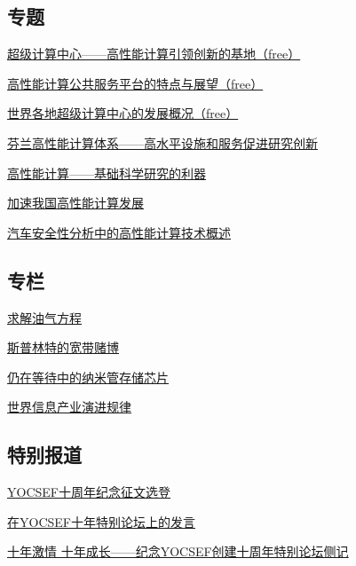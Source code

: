 \documentclass[a4paper]{article}
\begin{document}
\subsection{专题}
\href{http://history.ccf.org.cn/resources/1190201776262/2010/04/15/028026.pdf}{超级计算中心——高性能计算引领创新的基地（free）}

\href{http://history.ccf.org.cn/resources/1190201776262/2010/04/15/028028.pdf}{高性能计算公共服务平台的特点与展望（free）}

\href{http://history.ccf.org.cn/resources/1190201776262/2010/04/15/028032.pdf}{世界各地超级计算中心的发展概况（free）}

\href{http://history.ccf.org.cn/resources/1190201776262/2010/04/15/028043.pdf}{芬兰高性能计算体系——高水平设施和服务促进研究创新}

\href{http://history.ccf.org.cn/resources/1190201776262/2010/04/15/028051.pdf}{高性能计算——基础科学研究的利器}

\href{http://history.ccf.org.cn/resources/1190201776262/2010/04/15/028057.pdf}{加速我国高性能计算发展}

\href{http://history.ccf.org.cn/resources/1190201776262/2010/04/15/028062.pdf}{汽车安全性分析中的高性能计算技术概述}

\subsection{专栏}
\href{http://history.ccf.org.cn/resources/1190201776262/2010/04/15/028066.pdf}{求解油气方程}

\href{http://history.ccf.org.cn/resources/1190201776262/2010/04/15/028071.pdf}{斯普林特的宽带赌博}

\href{http://history.ccf.org.cn/resources/1190201776262/2010/04/15/028076.pdf}{仍在等待中的纳米管存储芯片}

\href{http://history.ccf.org.cn/resources/1190201776262/2010/04/15/028079.pdf}{世界信息产业演进规律}

\subsection{特别报道}
\href{http://history.ccf.org.cn/resources/1190201776262/2010/04/15/028015.pdf}{YOCSEF十周年纪念征文选登}

\href{http://history.ccf.org.cn/resources/1190201776262/2010/04/15/028013.pdf}{在YOCSEF十年特别论坛上的发言}

\href{http://history.ccf.org.cn/resources/1190201776262/2010/04/15/028008.pdf}{十年激情  十年成长——纪念YOCSEF创建十周年特别论坛侧记}
\end{document}
